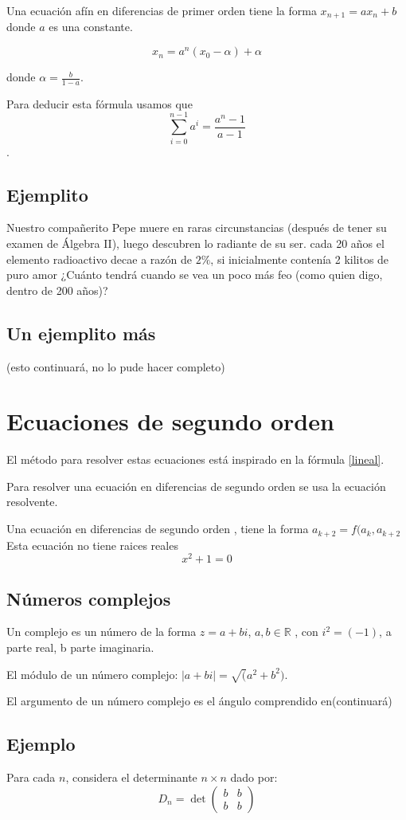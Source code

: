 \documentclass{article}
\begin{document}
Una ecuación afín en diferencias de primer orden tiene la forma $x_{n+1}=ax_n+b$ donde $a$ es una constante. 

\begin{equation}
  \label{afin}
  x_n=a^n(x_0-\alpha)+\alpha
\end{equation}

donde $\alpha=\frac{b}{1-a}$. 

Para deducir esta fórmula usamos que $$\sum_{i=0}^{n-1}a^i=\frac{a^n-1}{a-1}$$.

\subsection{Ejemplito}

Nuestro compañerito Pepe muere en raras circunstancias (después de tener su examen de Álgebra II), luego descubren lo radiante de su ser. cada 20 años el elemento radioactivo decae a razón de $2\%$, si inicialmente contenía 2 kilitos de puro amor ¿Cuánto tendrá cuando se vea un poco más feo (como quien digo, dentro de 200 años)?

\subsection{Un ejemplito más}

(esto continuará, no lo pude hacer completo)

\section{Ecuaciones de segundo orden}

El método para resolver estas ecuaciones está inspirado en la fórmula \ref{lineal}.

Para resolver una ecuación en diferencias de segundo orden se usa la ecuación resolvente.

Una ecuación en diferencias de segundo orden , tiene la forma $a_{k+2}=f(a_k ,a_{k+2}$
Esta ecuaci\'on no tiene raices reales $$x^2+1=0$$

\subsection{Números  complejos}

Un complejo es un número de la forma $z=a+bi$, $a,b\in\mathbb{R}$ , con $i^2=(-1)$, a parte real, b parte imaginaria.

El módulo de un número complejo: $|a+bi|=\surd(a^2+b^2)$.


El argumento de un número complejo es el ángulo comprendido en(continuará)


\subsection{Ejemplo}

Para cada $n$, considera el determinante $n\times n$ dado por:
\begin{equation}
  \label{eq:1}
  D_n=\det
  \begin{pmatrix}
    b & b\\
    b & b 
  \end{pmatrix}
\end{equation}
\end{document}
